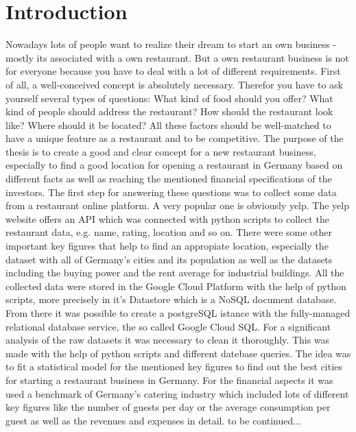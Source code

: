 \section{Introduction}
\label{sec:introduction}
Nowadays lots of people want to realize their dream to start an own business - mostly its associated with a own restaurant. But a own restaurant business is not for everyone because you have to deal with a lot of different requirements. First of all, a well-conceived concept is absolutely necessary. Therefor you have to ask yourself several types of questions: What kind of food should you offer? What kind of people should address the restaurant? How should the restaurant look like? Where should it be located? All these factors should be well-matched to have a unique feature as a restaurant and to be competitive.
 The purpose of the thesis is to create a good and clear concept for a new restaurant business, especially to find a good location for opening a restaurant in Germany based on different facts as well as reaching the mentioned financial specifications of the investors. 
The first step for answering these questions was to collect some data from a restaurant online platform. A very popular one is obviously yelp. The yelp website offers an API which was connected with python scripts to collect the restaurant data, e.g. name, rating, location and so on. There were some other important key figures that help to find an appropiate location, especially the dataset with all of Germany's cities and its population as well as the datasets including the buying power and the rent average for industrial buildings. All the collected data were stored in the Google Cloud Platform with the help of python scripts, more precisely in it's Datastore which is a NoSQL document database. From there it was possible to create a postgreSQL istance with the fully-managed relational database service, the so called Google Cloud SQL. For a significant analysis of the raw datasets it was necessary to clean it thoroughly. This was made with the help of python scripts and different datebase queries. The idea was to fit a statistical model for the mentioned key figures to find out the best cities for starting a restaurant business in Germany. For the financial aspects it was used a benchmark of Germany's catering industry which included lots of different key figures like the number of guests per day or the average consumption per guest as well as the revenues and expenses in detail. 
to be continued...

